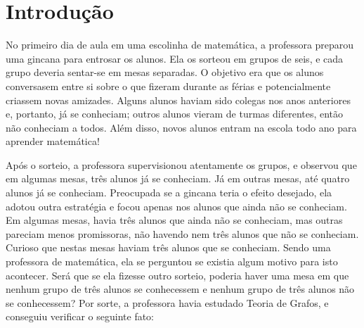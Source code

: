 
\chapter{Introdução}

No primeiro dia de aula em uma escolinha de matemática, a professora preparou uma gincana para entrosar os alunos. Ela os sorteou em grupos de seis, e cada grupo deveria sentar-se em mesas separadas. O objetivo era que os alunos conversasem entre si sobre o que fizeram durante as férias e potencialmente criassem novas amizades. Alguns alunos haviam sido colegas nos anos anteriores e, portanto, já se conheciam; outros alunos vieram de turmas diferentes, então não conheciam a todos. Além disso, novos alunos entram na escola todo ano para aprender matemática!

Após o sorteio, a professora supervisionou atentamente os grupos, e observou que em algumas mesas, três alunos já se conheciam. Já em outras mesas, até quatro alunos já se conheciam. Preocupada se a gincana teria o efeito desejado, ela adotou outra estratégia e focou apenas nos alunos que ainda não se conheciam. Em algumas mesas, havia três alunos que ainda não se conheciam, mas outras pareciam menos promissoras, não havendo nem três alunos que não se conheciam. Curioso que nestas mesas haviam três alunos que se conheciam. Sendo uma professora de matemática, ela se perguntou se existia algum motivo para isto acontecer. Será que se ela fizesse outro sorteio, poderia haver uma mesa em que nenhum grupo de três alunos se conhecessem e nenhum grupo de três alunos não se conhecessem? Por sorte, a professora havia estudado Teoria de Grafos, e conseguiu verificar o seguinte fato:


